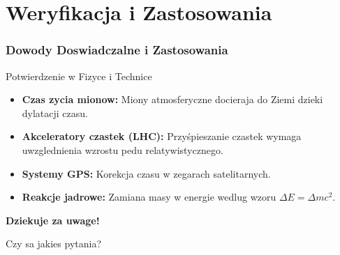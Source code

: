 \documentclass[10pt,aspectratio=169]{beamer}
\begin{document}
\section{Weryfikacja i Zastosowania}
\begin{frame}{\frametitle{Dowody Doswiadczalne i Zastosowania}}
    \begin{exampleblock}{Potwierdzenie w Fizyce i Technice}
        \begin{itemize}
            \item \textbf{Czas zycia mionow:} Miony atmosferyczne docieraja do Ziemi dzieki dylatacji czasu.
            \item \textbf{Akceleratory czastek (LHC):} Przyśpieszanie czastek wymaga uwzglednienia wzrostu pedu relatywistycznego.
            \item \textbf{Systemy GPS:} Korekcja czasu w zegarach satelitarnych.
            \item \textbf{Reakcje jadrowe:} Zamiana masy w energie wedlug wzoru $\Delta E = \Delta m c^2$.
        \end{itemize}
    \end{exampleblock}
\end{frame}

\begin{frame}
    \centering
    \Huge \textbf{Dziekuje za uwage!}
    
    \vspace{1cm}
    
    \Large Czy sa jakies pytania?
\end{frame}
\end{document}
